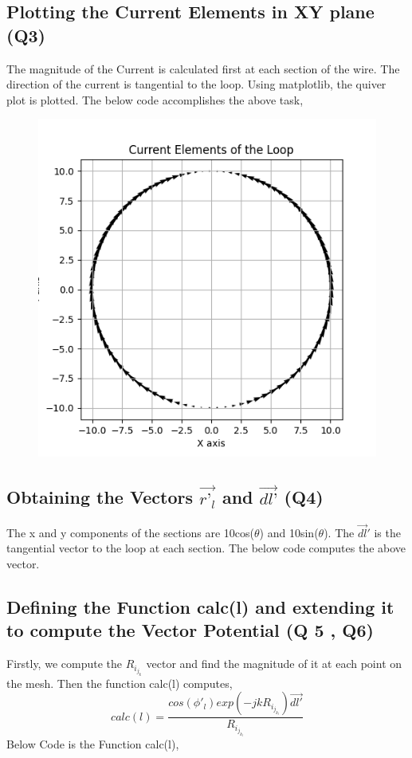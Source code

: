 \documentclass[12pt, a4paper]{report}
\begin{document}
\subsection{Plotting the Current Elements in XY plane (Q3)}
The magnitude of the Current is calculated first at each section of the wire. The direction of the current is tangential to the loop. Using matplotlib, the quiver plot is plotted. The below code accomplishes the above task,
\noindent

\begin{figure}[h!]
    \centering
    \includegraphics[scale=0.7]{fig1.png} 
    \caption{}
    \label{fig:my_label}
\end{figure}
\subsection{Obtaining the Vectors $\vec{r’_l}$ and $\vec{dl’}$ (Q4)}
 The x and y components of the sections are 10cos($\theta$) and  10sin($\theta$). The $\vec{dl}'$ is the tangential vector to the loop at each section. The below code computes the above vector.
\noindent

\subsection{Defining the Function calc(l) and extending it to compute the Vector Potential (Q 5 , Q6) }
Firstly, we compute the $R_i_j_k$ vector and find the magnitude of it at each point on the mesh. Then the function calc(l) computes,
\begin{equation}
    calc(l) = \frac{cos(\phi'_l)exp(-jkR_i_j_k_l)\overrightarrow{dl'}}{R_i_j_k_l}
\end{equation}
Below Code is the Function calc(l),
\noindent

\end{document}
